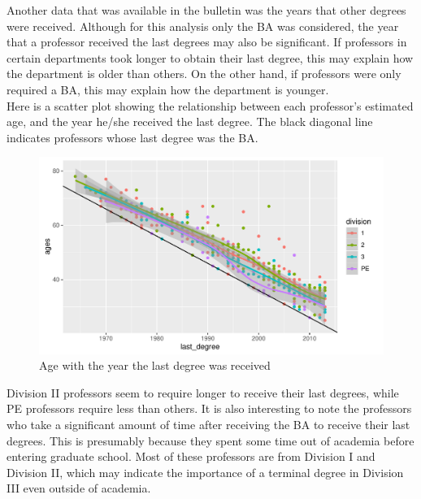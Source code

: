 \documentclass{article}\usepackage[]{graphicx}\usepackage[]{color}
\makeatletter
\def\maxwidth{ %
  \ifdim\Gin@nat@width>\linewidth
    \linewidth
  \else
    \Gin@nat@width
  \fi
}
\newenvironment{knitrout}{}{} %
\makeatother
\begin{document}
Another data that was available in the bulletin was the years that other degrees were received. Although
for this analysis only the BA was considered, the year that a professor received the last degrees may also
be significant. If professors in certain departments took longer to obtain their last degree, this may
explain how the department is older than others. On the other hand, if professors were only required a
BA, this may explain how the department is younger.\\

Here is a scatter plot showing the relationship between each professor's estimated age, and the year he/she
received the last degree. The black diagonal line indicates professors whose last degree was the BA.\\

\begin{knitrout}
\color{fgcolor}\begin{figure}[h]
\includegraphics[width=\maxwidth]{figure/unnamed-chunk-7-1} \caption[Age with the year the last degree was received]{Age with the year the last degree was received}\label{fig:unnamed-chunk-7}
\end{figure}


\end{knitrout}

Division II professors seem to require longer to receive their last degrees, while PE professors require
less than others. It is also interesting to note the professors who take a significant amount of time
after receiving the BA to receive their last degrees. This is presumably because they spent some time out
of academia before entering graduate school. Most of these professors are from Division I and Division II,
which may indicate the importance of a terminal degree in Division III even outside of academia.\\
\end{document}
